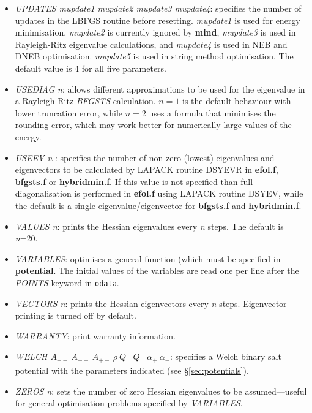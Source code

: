 \documentclass[12pt,a4paper,dvips]{article}
\begin{document}
\begin{itemize}
\item {\it UPDATES mupdate1 mupdate2 mupdate3 mupdate4\/}: 
specifies the number of updates in the LBFGS routine before
      resetting. 
{\it mupdate1\/} is used for energy minimisation, 
{\it mupdate2\/} is currently ignored by {\bf mind},
{\it mupdate3\/} is used in Rayleigh-Ritz eigenvalue calculations, and 
{\it mupdate4\/} is used in NEB and DNEB optimisation. 
{\it mupdate5\/} is used in string method optimisation. 
The default value is 4 for all five parameters.

\item {\it USEDIAG n\/}: allows different approximations to be used for the 
eigenvalue in a Rayleigh-Ritz {\it BFGSTS\/} calculation. $n=1$ is the default behaviour
with lower truncation error,
while $n=2$ uses a formula that minimises the rounding error, which may
work better for numerically large values of the energy.

\item {\it USEEV n \/}: specifies the number of non-zero (lowest) eigenvalues and
eigenvectors to be calculated by LAPACK routine DSYEVR in {\bf efol.f},
{\bf bfgsts.f} or {\bf hybridmin.f}.
If this value is not specified than full diagonalisation is performed in 
{\bf efol.f} using LAPACK routine DSYEV, while the default is a single
eigenvalue/eigenvector for {\bf bfgsts.f} and {\bf hybridmin.f}.

\item {\it VALUES n\/}: prints the Hessian eigenvalues every {\it n\/} steps.
The default is {\it n\/}=20.

\item {\it VARIABLES\/}: optimises a general function (which must be specified in
{\bf potential}. The initial values of the variables are read one per line after the {\it POINTS\/}
keyword in {\tt odata}.

\item {\it VECTORS n\/}: prints the Hessian eigenvectors every {\it n\/}
steps. Eigenvector printing is turned off by default.

\item {\it WARRANTY\/}: print warranty information.

\item {\it WELCH $A_{++}\ A_{--}\ A_{+-}\ \rho\ Q_+\ Q_-\ \alpha_+\ \alpha_-$\/}: specifies a Welch binary
salt potential with the parameters indicated (see \S\ref{sec:potentials}).

\item {\it ZEROS n\/}: sets the number of zero Hessian eigenvalues to be
assumed---useful for general optimisation problems specified by {\it VARIABLES\/}. 
\end{itemize}
\end{document}

